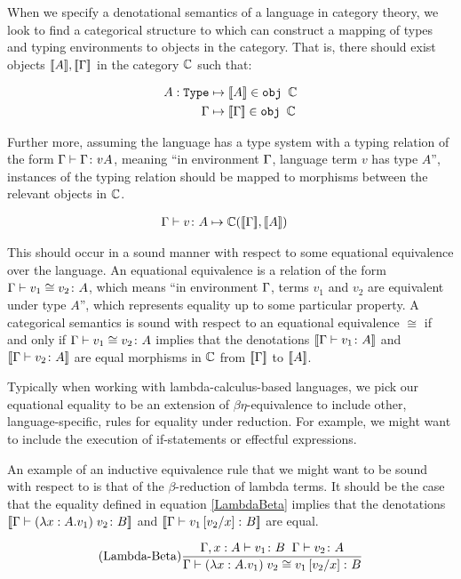 \documentclass{Report}
\begin{document}
When we specify a denotational semantics of a language in category theory, we look to find a categorical structure to which can construct a mapping of types and typing environments to objects in the category.  That is, there should exist objects $\deno{A}, \deno{\G}$ in the category $\C$ such that:

\begin{align}
    A: \type & \mapsto \deno{A} \in \obj \C \\
    \G & \mapsto  \deno{\G} \in \obj \C
\end{align}

Further more, assuming the language has a type system with a typing relation of the form $\gtyperelation{\G}{v}{A}$, meaning ``in environment $\G$, language term $v$ has type $A$'', instances of the typing relation should be mapped to morphisms between the relevant objects in $\C$.

\begin{align}
    \gtyperelation{v}{A} & \mapsto \C(\deno{\G}, \deno{A}) 
\end{align}

This should occur in a sound manner with respect to some equational equivalence over the language. An equational equivalence is a relation of the form $\gtyperelation{v_1 \cong v_2}{A}$, which means ``in environment $\G$, terms $v_1$ and $v_2$ are equivalent under type $A$'', which represents equality up to some particular property. A categorical semantics is sound with respect to an equational equivalence $\cong$ if and only if $\gtyperelation{v_1 \cong v_2}{A}$ implies that the denotations $\deno{\gtyperelation{v_1}{A}}$ and $\deno{\gtyperelation{v_2}{A}}$ are equal morphisms in $\C$ from $\deno{\G}$ to $\deno{A}$.

Typically when working with lambda-calculus-based languages, we pick our equational equality to be an extension of $\beta\eta$-equivalence to include other, language-specific, rules for equality under reduction. For example, we might want to include the execution of if-statements or effectful expressions.

An example of an inductive equivalence rule that we might want to be sound with respect to is that of the $\beta$-reduction of lambda terms. It should be the case that the equality defined in equation \ref{LambdaBeta} implies that the denotations $\deno{\gtyperelation{\apply{(\lam{x}{A}{v_1})}{v_2}}{B}}$ and $\deno{\gtyperelation{v_1\ssub{x}{v_2}}{B}}$ are equal.

\begin{align}\label{LambdaBeta}
    \treerule{Lambda-Beta}{\typerelation{\gax}{v_1}{B}\s\s\gtyperelation{v_2}{A}}{\gberelation{\apply{(\lam{x}{A}{v_1})}{v_2}}{v_1\ssub{x}{v_2}}{B}}
\end{align}
\end{document}
